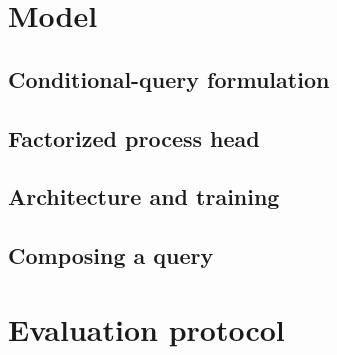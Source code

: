 \documentclass[11pt]{article}
\begin{document}
\section{Model}
\subsection{Conditional-query formulation}

\subsection{Factorized process head}

\subsection{Architecture and training}

\subsection{Composing a query}

\section{Evaluation protocol}
\end{document}
